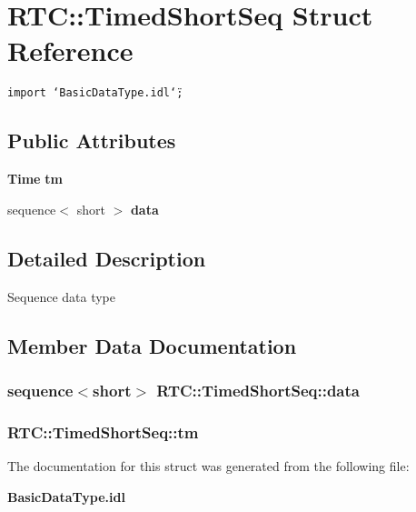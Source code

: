 \section{RTC::Timed\-Short\-Seq Struct Reference}
\label{structRTC_1_1TimedShortSeq}
{\tt import \char`\"{}Basic\-Data\-Type.idl\char`\"{};}

\subsection*{Public Attributes}
\begin{CompactItemize}
\item 
{\bf Time} {\bf tm}
\item 
sequence$<$ short $>$ {\bf data}
\end{CompactItemize}


\subsection{Detailed Description}
Sequence data type 



\subsection{Member Data Documentation}
\subsubsection{\setlength{\rightskip}{0pt plus 5cm}sequence$<$short$>$ {\bf RTC::Timed\-Short\-Seq::data}}\label{structRTC_1_1TimedShortSeq_RTC_1_1TimedShortSeqo1}


\subsubsection{ {\bf RTC::Timed\-Short\-Seq::tm}}\label{structRTC_1_1TimedShortSeq_RTC_1_1TimedShortSeqo0}




The documentation for this struct was generated from the following file:\begin{CompactItemize}
\item 
{\bf Basic\-Data\-Type.idl}\end{CompactItemize}
